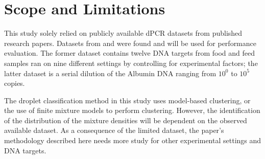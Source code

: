 \section{Scope and Limitations}
\label{sec:significance}
This study solely relied on publicly available dPCR datasets from published research papers. Datasets from  and  were found and will be used for performance evaluation. The former dataset contains twelve DNA targets from food and feed samples ran on nine different settings by controlling for experimental factors; the latter dataset is a serial dilution of the Albumin DNA ranging from \(10^0\) to \(10^5\) copies. 

The droplet classification method in this study uses model-based clustering, or the use of finite mixture models to perform clustering. However, the identification of the distribution of the mixture densities will be dependent on the observed available dataset. As a consequence of the limited dataset, the paper's methodology described here needs more study for other experimental settings and DNA targets.

